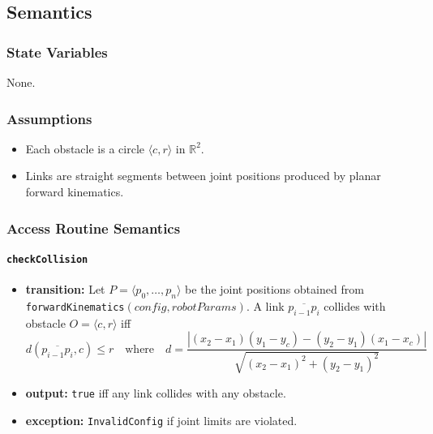 \documentclass[12pt, titlepage]{article}
\begin{document}
\subsection{Semantics}
\subsubsection{State Variables}
None.

\subsubsection{Assumptions}
\begin{itemize}
  \item Each obstacle is a circle $\langle c,r\rangle$ in $\mathbb{R}^2$.
  \item Links are straight segments between joint positions produced by planar forward kinematics.
\end{itemize}

\subsubsection{Access Routine Semantics}

\paragraph{\texttt{checkCollision}}
\begin{itemize}
  \item \textbf{transition:} Let $P=\langle p_0,\dots,p_n\rangle$ be the joint positions obtained from \texttt{forwardKinematics}$(config,robotParams)$.  
        A link $\overline{p_{i-1}p_i}$ collides with obstacle $O=\langle c,r\rangle$ iff
        \[
          d(\overline{p_{i-1}p_i},c) \le r
          \quad\text{where}\quad
          d = \frac{|(x_2-x_1)(y_1-y_c)-(y_2-y_1)(x_1-x_c)|}
                 {\sqrt{(x_2-x_1)^2+(y_2-y_1)^2}}
        \]
  \item \textbf{output:} \texttt{true} iff any link collides with any obstacle.
  \item \textbf{exception:} \texttt{InvalidConfig} if joint limits are violated.
\end{itemize}
\end{document}
